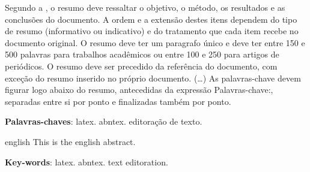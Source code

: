 
\setlength{\absparsep}{18pt} %
\begin{resumo}
 Segundo a , o resumo deve ressaltar o objetivo, o método, os resultados e as conclusões do documento. A ordem e a extensão destes itens dependem do tipo de resumo (informativo ou indicativo) e do  tratamento que cada item recebe no documento original. O resumo deve ter um paragrafo único e deve ter entre 150 e 500 palavras para trabalhos acadêmicos ou entre 100 e 250 para artigos de periódicos. O resumo deve ser  precedido da referência do documento, com exceção do resumo inserido no  próprio documento. (\ldots) As palavras-chave devem figurar logo abaixo do resumo, antecedidas da expressão Palavras-chave:, separadas entre si por ponto e finalizadas também por ponto.


 \textbf{Palavras-chaves}: latex. abntex. editoração de texto.
\end{resumo}

\begin{resumo}[Abstract]
 \begin{otherlanguage*}{english}
   This is the english abstract.
   \vspace{\onelineskip}
 
   \noindent 
   \textbf{Key-words}: latex. abntex. text editoration.
 \end{otherlanguage*}
\end{resumo}